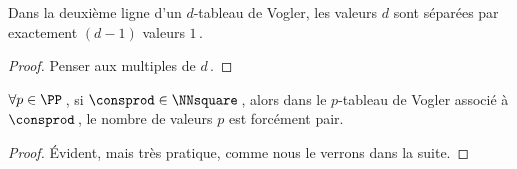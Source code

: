 

\begin{fact} \label{vogler-multiple}
	Dans la deuxième ligne d'un $d$-tableau de Vogler, les valeurs $d$ sont séparées par exactement $(d-1)$ valeurs $1$\,.
\end{fact}


\begin{proof}
	Penser aux multiples de $d$\,.
\end{proof}




\begin{fact} \label{vogler-parity-square}
	$\forall p \in \PP$\,, si $\consprod \in \NNsquare$\,, alors dans le $p$-tableau de Vogler associé à $\consprod$\,, le nombre de valeurs $p$ est forcément pair.
\end{fact}


\begin{proof}
	Évident, mais très pratique, comme nous le verrons dans la suite.
\end{proof}

